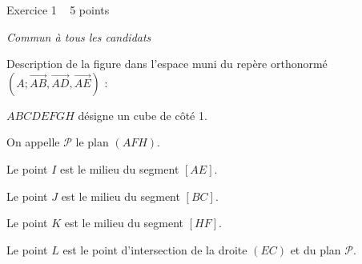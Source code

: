 
%
\begin{h2}Exercice 1   5 points\end{h2}
\textit{Commun à tous les candidats}
\par
Description de la figure dans l'espace muni du repère orthonormé  $\left(A ;  \overrightarrow{AB}, \overrightarrow{AD}, \overrightarrow{AE}\right)$  :
\par
$ABCDEFGH$ désigne un cube de côté 1.
\par
On appelle $\mathscr P$ le plan $\left(AFH\right)$.
\par
Le point $I$ est le milieu du segment $\left[AE\right]$.
\par
Le point $J$ est le milieu du segment $\left[BC\right]$.
\par
Le point $K$ est le milieu du segment $\left[HF\right]$.
\par
Le point $L$ est le point d'intersection de la droite $\left(EC\right)$ et du plan $\mathscr P$.

